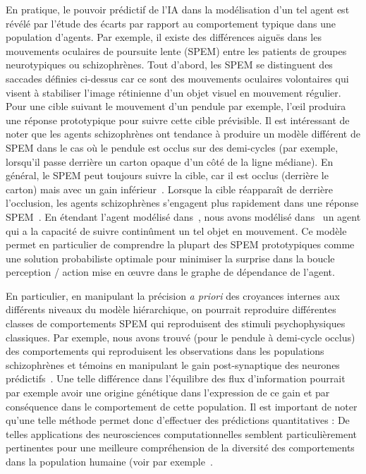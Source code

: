 \documentclass[11pt,french,a4paper,oneside]{article}%
\begin{document}
En pratique, le pouvoir prédictif de l'IA dans la modélisation d'un tel
agent est révélé par l'étude des écarts par rapport au comportement
typique dans une population d'agents. Par exemple, il existe des
différences aiguës dans les mouvements oculaires de poursuite lente
(SPEM) entre les patients de groupes neurotypiques ou schizophrènes.
Tout d'abord, les SPEM se distinguent des saccades définies
ci-dessus car ce sont des mouvements oculaires volontaires qui visent à
stabiliser l'image rétinienne d'un objet visuel en mouvement régulier.
Pour une cible suivant le mouvement d'un pendule par exemple, l'œil
produira une réponse prototypique pour suivre cette cible prévisible. Il
est intéressant de noter que les agents schizophrènes ont tendance à
produire un modèle différent de SPEM dans le cas où le pendule est
occlus sur des demi-cycles (par exemple, lorsqu'il passe derrière un
carton opaque d'un côté de la ligne médiane). En général, le SPEM peut
toujours suivre la cible, car il est occlus (derrière le carton) mais
avec un gain inférieur~\citep{Barnes91}. Lorsque la cible
réapparaît de derrière l'occlusion, les agents schizophrènes s'engagent
plus rapidement dans une réponse SPEM~\citep{Avila06}. En étendant
l'agent modélisé dans~\citep{Friston12}, nous avons  modélisé dans~\citep{Adams12}
un agent qui a la capacité de suivre continûment un tel objet en mouvement.
Ce modèle permet en particulier de
comprendre la plupart des SPEM prototypiques comme une solution
probabiliste optimale  pour minimiser la surprise dans la boucle perception
/ action mise en œuvre dans le graphe de dépendance de l'agent.

En particulier, en manipulant la précision \emph{a priori} des croyances
internes aux différents niveaux du modèle hiérarchique, on pourrait
reproduire différentes classes de comportements SPEM qui reproduisent
des stimuli psychophysiques classiques. Par exemple, nous avons trouvé (pour le pendule à demi-cycle occlus) des comportements qui reproduisent les observations dans les populations schizophrènes et témoins en manipulant
le gain post-synaptique des neurones
prédictifs~\citep{Adams12}. Une
telle différence dans l'équilibre des flux d'information pourrait par
exemple avoir une origine génétique dans l'expression de ce gain et par
conséquence dans le comportement de cette population. Il est important
de noter qu'une telle méthode permet donc d'effectuer des prédictions
quantitatives : De telles applications des neurosciences
computationnelles semblent particulièrement pertinentes pour une
meilleure compréhension de la diversité des comportements dans la
population humaine (voir par exemple~\citep{Karvelis18autistic,Kent19}.
\end{document}
